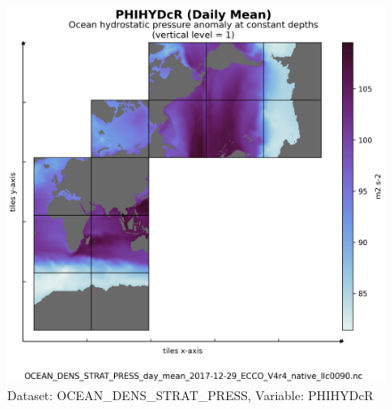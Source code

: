 \begin{longtable}{|m{}|m{}|m{}|m{}|}
\end{longtable}

\begin{figure}[H]
\centering
\includegraphics[scale=0.55]{../images/plots/v4r4/native_plots/Ocean_Density_Stratification_and_Hydrostatic_Pressure/PHIHYDcR.png}
\caption{Dataset: OCEAN\_DENS\_STRAT\_PRESS, Variable: PHIHYDcR}
\label{tab:table-OCEAN_DENS_STRAT_PRESS_PHIHYDcR-Plot}
\end{figure}
\newpage
\pagebreak

